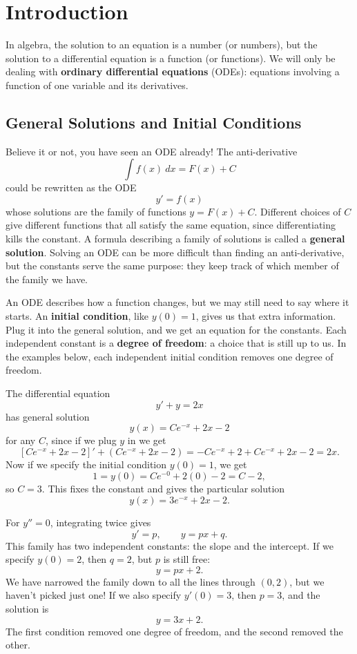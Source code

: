 
\section{Introduction}

In algebra, the solution to an equation is a number (or numbers), but the
solution to a differential equation is a function (or functions). We will
only be dealing with \textbf{ordinary differential equations} (ODEs):
equations involving a function of one variable and its derivatives.

\subsection{General Solutions and Initial Conditions}

Believe it or not, you have seen an ODE already! The anti-derivative
$$\int f(x)\ dx = F(x)+C$$
could be rewritten as the ODE
$$y' = f(x)$$
whose solutions are the family of functions $y=F(x)+C$. Different choices
of $C$ give different functions that all satisfy the same equation,
since differentiating kills the constant. A formula describing a family
of solutions is called a \textbf{general solution}. Solving an ODE can
be more difficult than finding an anti-derivative, but the constants
serve the same purpose: they keep track of which member of the family
we have.

An ODE describes how a function changes, but we may still need to say
where it starts. An \textbf{initial condition}, like $y(0)=1$, gives us
that extra information. Plug it into the general solution, and we get an
equation for the constants. Each independent constant is a \textbf{degree
of freedom}: a choice that is still up to us. In the examples below,
each independent initial condition removes one degree of freedom.

\begin{exampleblock}
The differential equation
$$y' + y = 2x$$
has general solution
$$y(x) = C e^{-x} + 2 x - 2$$
for any $C$, since if we plug $y$ in we get
$$
\left[C e^{-x} + 2 x - 2\right]'+\left(C e^{-x} + 2 x - 2\right)=
-C e^{-x} + 2+ C e^{-x} + 2 x - 2 = 2x.
$$
Now if we specify the initial condition $y(0)=1$, we get
$$ 1=y(0)=C e^{-0} + 2 (0) - 2 = C - 2,$$
so $C=3$. This fixes the constant and gives the particular solution
$$y(x)=3e^{-x}+2x-2.$$
\end{exampleblock}

\begin{exampleblock}
For $y''=0$, integrating twice gives
$$y'=p,\qquad y=px+q.$$
This family has two independent constants: the slope and the intercept.
If we specify $y(0)=2$, then $q=2$, but $p$ is still free:
$$y=px+2.$$
We have narrowed the family down to all the lines through $(0,2)$, but
we haven't picked just one! If we also specify $y'(0)=3$, then $p=3$,
and the solution is
$$y=3x+2.$$
The first condition removed one degree of freedom, and the second
removed the other.
\end{exampleblock}

